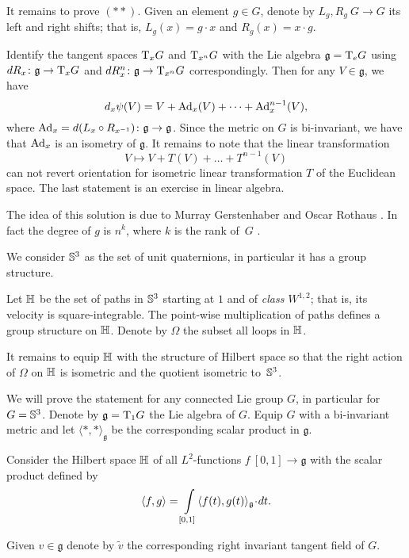 It remains to prove $({*}{*})$.
Given an element $g\in G$, denote by $L_g,R_g\:G\to G$ its left and right shifts;
that is, $L_g(x)=g\cdot x$ and $R_g(x)=x\cdot g$.

Identify the tangent spaces $\mathrm{T}_xG$ and $\mathrm{T}_{x^n}G$ with the Lie algebra $\mathfrak{g}=\mathrm{T}_eG$
using $d{R_x}\colon\mathfrak{g}\to \mathrm{T}_xG$ and $d{R_x^n}\colon\mathfrak{g}\to \mathrm{T}_{x^n}G$ correspondingly.
Then for any $V\in \mathfrak{g}$, we have
\[d_x\psi(V)=V+\mathrm{Ad}_x(V)+\dots+\mathrm{Ad}_x^{n-1}(V),\]
where $\mathrm{Ad}_x=d(L_x\circ R_{x^{-1}})\colon\mathfrak{g}\to \mathfrak{g}$. 
Since the metric on $G$ is bi-invariant, we have that $\mathrm{Ad}_x$ is an isometry of $\mathfrak{g}$.
It remains to note that the linear transformation
\[V\mapsto V+T(V)+\dots+T^{n-1}(V)\]
can not revert orientation for isometric linear transformation $T$ of the Euclidean space.
The last statement is an exercise in linear algebra.
\qeds

The idea of this solution is due to Murray Gerstenhaber and Oscar Rothaus 
\cite[see][]{gerstenhaber-rothaus}.
In fact the degree of $g$ is $n^k$, where $k$ is the rank of~$G$ \cite[see][]{hopf}.

We consider $\mathbb{S}^3$ as the set of unit quaternions, in particular it has a group structure.

Let $\mathbb{H}$ be the set of paths in $\mathbb{S}^3$ starting at $1$ and of \emph{class $W^{1,2}$};
that is, its velocity is square-integrable.
The point-wise multiplication of paths defines a group structure on $\mathbb{H}$.
Denote by $\Omega$ the subset all loops in $\mathbb{H}$.

It remains to equip $\mathbb{H}$ with the structure of Hilbert space so that 
the right action of $\Omega$ on $\mathbb{H}$ is isometric and the quotient isometric to~$\mathbb{S}^3$.

\medskip

We will prove the statement for any connected Lie group $G$, in particular for $G=\mathbb{S}^3$.
Denote by $\mathfrak{g}=\mathrm{T}_1G$ the Lie algebra of $G$.
Equip $G$ with a bi-invariant metric and let $\langle{*},{*}\rangle_{\mathfrak{g}}$ be the corresponding scalar product in $\mathfrak{g}$.

Consider the Hilbert space $\mathbb{H}$ of all $L^2$-functions $f\:[0,1]\to\mathfrak{g}$ with the scalar product defined by
\[\<f,g\>=\int\limits_{[0,1]}\<f(t),g(t)\>_{\mathfrak{g}}\cdot dt.\]


Given $v\in \mathfrak{g}$ denote by $\tilde v$ the corresponding right invariant tangent field of $G$.

